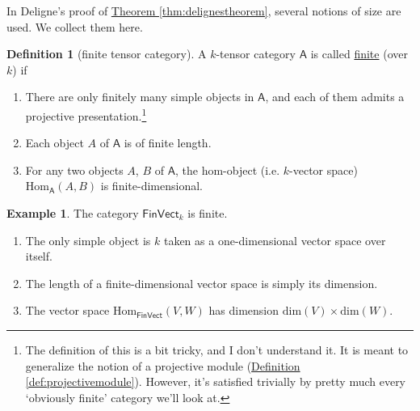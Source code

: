 \documentclass[a4paper]{report}
\newcommand{\defn}[1]{\ul{#1}}
\newcommand{\Hom}{\mathrm{Hom}}
\theoremstyle{definition}
\newtheorem{definition}{Definition}[section]
\newtheorem{example}{Example}[section]
\theoremstyle{plain}
\theoremstyle{remark}
\begin{document}
In Deligne's proof of \hyperref[thm:delignestheorem]{Theorem \ref*{thm:delignestheorem}}, several notions of size are used. We collect them here.

\begin{definition}[finite tensor category]
  \label{def:finitetensorcategory}
  A $k$-tensor category $\mathsf{A}$ is called \defn{finite} (over $k$) if 
  \begin{enumerate}
    \item There are only finitely many simple objects in $\mathsf{A}$, and each of them admits a projective presentation.\footnote{The definition of this is a bit tricky, and I don't understand it. It is meant to generalize the notion of a projective module (\hyperref[def:projectivemodule]{Definition \ref*{def:projectivemodule}}). However, it's satisfied trivially by pretty much every `obviously finite' category we'll look at.}

    \item Each object $A$ of $\mathsf{A}$ is of finite length.

    \item For any two objects $A$, $B$ of $\mathsf{A}$, the hom-object (i.e. $k$-vector space) $\Hom_{\mathsf{A}}(A, B)$ is finite-dimensional.
  \end{enumerate}
\end{definition}

\begin{example}
  The category $\mathsf{FinVect}_{k}$ is finite. 
  \begin{enumerate}
    \item The only simple object is $k$ taken as a one-dimensional vector space over itself.

    \item The length of a finite-dimensional vector space is simply its dimension.

    \item The vector space $\Hom_{\mathsf{FinVect}}(V, W)$ has dimension $\mathrm{dim}(V) \times\mathrm{dim}(W)$.
  \end{enumerate}
\end{example}
\end{document}
